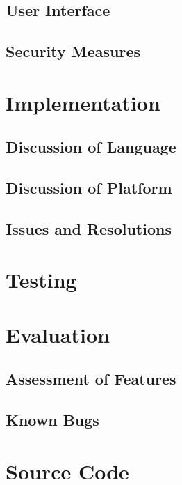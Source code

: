\documentclass[draft]{book}
\begin{document}
\section{User Interface}

\section{Security Measures}


\chapter{Implementation}

\section{Discussion of Language}

\section{Discussion of Platform}

\section{Issues and Resolutions}


\chapter{Testing}


\chapter{Evaluation}

\section{Assessment of Features}

\section{Known Bugs}

\appendix

\chapter{Source Code}

\backmatter

\listoffigures

\listoftables



\printglossaries
\end{document}

